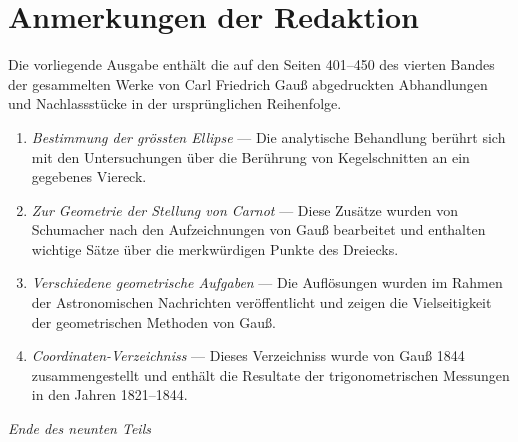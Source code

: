 \documentclass[12pt,a4paper]{article}
\begin{document}
\vspace{2em}

\section*{Anmerkungen der Redaktion}

Die vorliegende Ausgabe enth\"alt die auf den Seiten 401--450 des vierten
Bandes der gesammelten Werke von Carl Friedrich Gau\ss{} abgedruckten
Abhandlungen und Nachlassst\"ucke in der urspr\"unglichen Reihenfolge.

\begin{enumerate}
\item \textit{Bestimmung der gr\"ossten Ellipse} --- Die analytische Behandlung
ber\"uhrt sich mit den Untersuchungen \"uber die Ber\"uhrung von Kegelschnitten
an ein gegebenes Viereck.

\item \textit{Zur Geometrie der Stellung von Carnot} --- Diese Zus\"atze wurden
von Schumacher nach den Aufzeichnungen von Gau\ss{} bearbeitet und
enthalten wichtige S\"atze \"uber die merkw\"urdigen Punkte des Dreiecks.

\item \textit{Verschiedene geometrische Aufgaben} --- Die Aufl\"osungen wurden
im Rahmen der Astronomischen Nachrichten ver\"offentlicht und zeigen
die Vielseitigkeit der geometrischen Methoden von Gau\ss{}.

\item \textit{Coordinaten-Verzeichniss} --- Dieses Verzeichniss wurde von Gau\ss{}
1844 zusammengestellt und enth\"alt die Resultate der trigonometrischen
Messungen in den Jahren 1821--1844.
\end{enumerate}

\vfill
\begin{center}
\textit{Ende des neunten Teils}
\end{center}
\end{document}
